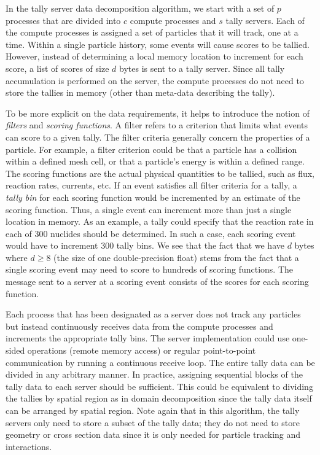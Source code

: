 \documentclass[3p]{elsarticle}
\begin{document}
In the tally server data decomposition algorithm, we start with a set of $p$
processes that are divided into $c$ compute processes and $s$ tally
servers. Each of the compute processes is assigned a set of particles that it
will track, one at a time. Within a single particle history, some events will
cause scores to be tallied. However, instead of determining a local memory
location to increment for each score, a list of scores of size $d$ bytes is sent
to a tally server. Since all tally accumulation is performed on the server, the
compute processes do not need to store the tallies in memory (other than
meta-data describing the tally).

To be more explicit on the data requirements, it helps to introduce the notion
of \emph{filters} and \emph{scoring functions}. A filter refers to a criterion
that limits what events can score to a given tally.  The filter criteria
generally concern the properties of a particle. For example, a filter criterion
could be that a particle has a collision within a defined mesh cell, or that a
particle's energy is within a defined range. The scoring functions are the
actual physical quantities to be tallied, such as flux, reaction rates,
currents, etc. If an event satisfies all filter criteria for a tally, a
\emph{tally bin} for each scoring function would be incremented by an estimate
of the scoring function. Thus, a single event can increment more than just a
single location in memory. As an example, a tally could specify that the
reaction rate in each of 300 nuclides should be determined. In such a case, each
scoring event would have to increment 300 tally bins. We see that the fact that
we have $d$ bytes where $d \ge 8$ (the size of one double-precision float) stems
from the fact that a single scoring event may need to score to hundreds of
scoring functions. The message sent to a server at a scoring event consists of
the scores for each scoring function.

Each process that has been designated as a server does not track any particles
but instead continuously receives data from the compute processes and increments
the appropriate tally bins. The server implementation could use one-sided
operations (remote memory access) or regular point-to-point communication by
running a continuous receive loop. The entire tally data can be divided in any
arbitrary manner. In practice, assigning sequential blocks of the tally data to
each server should be sufficient. This could be equivalent to dividing the
tallies by spatial region as in domain decomposition since the tally data itself
can be arranged by spatial region. Note again that in this algorithm, the tally
servers only need to store a subset of the tally data; they do not need to store
geometry or cross section data since it is only needed for particle tracking and
interactions.
\end{document}
